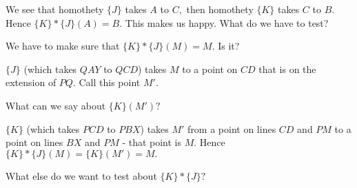 
We see that homothety $\{J\}$ takes $A$ to $C,$ then homothety $\{K\}$ takes $C$ to $B.$  Hence $\{K\} * \{J\}(A) = B.$  This makes us happy.  What do we have to test?



We have to make sure that $\{K\} * \{J\} (M) = M.$  Is it?


$\{J\}$ (which takes $QAY$ to $QCD$) takes $M$ to a point on $CD$ that is on the extension of $PQ.$  Call this point $M'.$

What can we say about $\{K\} (M')?$







$\{K\}$ (which takes $PCD$ to $PBX$) takes $M'$ from a point on lines $CD$ and $PM$ to a point on lines $BX$ and $PM$ - that point is $M.$  Hence $\{K\} * \{J\} (M) = \{K\} (M') = M.$

What else do we want to test about $\{K\} * \{J\}?$




